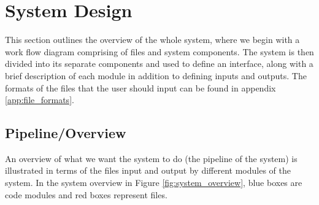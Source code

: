 \documentclass[12pt,twoside,notitlepage]{report}
\begin{document}
    \section{System Design}
        This section outlines the overview of the whole system, where we begin with a work flow diagram comprising of 
        files and system components. The system is then divided into its separate components and used to define an 
        interface, along with a brief description of each module in addition to defining inputs and outputs. The formats of the files 
        that the user should input can be found in appendix \ref{app:file_formats}.


        \subsection{Pipeline/Overview}
            An overview of what we want the system to do (the pipeline of the system) is illustrated in terms of the 
            files input and output by different modules of the system. In the system overview in Figure \ref{fig:system_overview}, 
            blue boxes are code modules and red boxes represent files.
\end{document}
